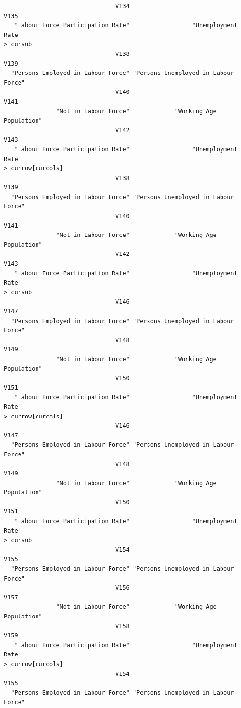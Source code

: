 \documentclass[a4paper]{article}
\begin{document}
\begin{verbatim}
                                V134                                 V135 
   "Labour Force Participation Rate"                  "Unemployment Rate" 
> cursub 
                                V138                                 V139 
  "Persons Employed in Labour Force" "Persons Unemployed in Labour Force" 
                                V140                                 V141 
               "Not in Labour Force"             "Working Age Population" 
                                V142                                 V143 
   "Labour Force Participation Rate"                  "Unemployment Rate" 
> currow[curcols] 
                                V138                                 V139 
  "Persons Employed in Labour Force" "Persons Unemployed in Labour Force" 
                                V140                                 V141 
               "Not in Labour Force"             "Working Age Population" 
                                V142                                 V143 
   "Labour Force Participation Rate"                  "Unemployment Rate" 
> cursub 
                                V146                                 V147 
  "Persons Employed in Labour Force" "Persons Unemployed in Labour Force" 
                                V148                                 V149 
               "Not in Labour Force"             "Working Age Population" 
                                V150                                 V151 
   "Labour Force Participation Rate"                  "Unemployment Rate" 
> currow[curcols] 
                                V146                                 V147 
  "Persons Employed in Labour Force" "Persons Unemployed in Labour Force" 
                                V148                                 V149 
               "Not in Labour Force"             "Working Age Population" 
                                V150                                 V151 
   "Labour Force Participation Rate"                  "Unemployment Rate" 
> cursub 
                                V154                                 V155 
  "Persons Employed in Labour Force" "Persons Unemployed in Labour Force" 
                                V156                                 V157 
               "Not in Labour Force"             "Working Age Population" 
                                V158                                 V159 
   "Labour Force Participation Rate"                  "Unemployment Rate" 
> currow[curcols] 
                                V154                                 V155 
  "Persons Employed in Labour Force" "Persons Unemployed in Labour Force" 

\end{verbatim}
\end{document}

